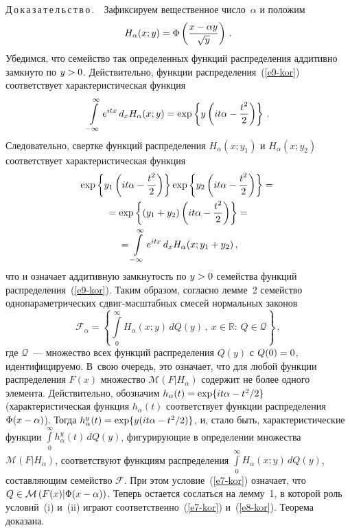 \begin{multicols}{2}
\noindent
Д\,о\,к\,а\,з\,а\,т\,е\,л\,ь\,с\,т\,в\,о\,.\ \  Зафиксируем вещественное чис\-ло~$\alpha$
и положим
\begin{equation}
H_{\alpha}(x;y)=\Phi\left(\displaystyle\frac{\displaystyle x-\alpha y\mathstrut}{\displaystyle \sqrt{y}\mathstrut}\right)\,.
\label{e9-kor}
\end{equation}
Убедимся, что семейство так определенных функций распределения
аддитивно замкнуто по $y\hm>0$. Действительно, функции распределения~(\ref{e9-kor}) 
соответствует характеристическая функция
$$
\int\limits_{-\infty}^{\infty}e^{itx}\,d_xH_{\alpha}(x;y)=\exp
\left\{y\left(it\alpha-\displaystyle\frac{\displaystyle t^2\mathstrut}{\displaystyle 2\mathstrut}\right)\right\}\,.
$$
Следовательно, свертке функций распределения $H_{\alpha}(x;y_1)$ и
$H_{\alpha}(x;y_2)$ соответствует характеристическая функция
\begin{multline*}
\exp\left\{y_1\left(it\alpha-\displaystyle\frac{\displaystyle t^2\mathstrut}{\displaystyle 2\mathstrut}\right)\right\}\exp
\left\{y_2\left(it\alpha-\displaystyle\frac{\displaystyle t^2\mathstrut}{\displaystyle 2\mathstrut}\right)\right\}={}\\
{}=
\exp\left\{\left(y_1+y_2\right)\left(it\alpha-\displaystyle\frac{\displaystyle t^2\mathstrut}{\displaystyle 2\mathstrut}\right)\right\}
={}\\
{}=\int\limits_{-\infty}^{\infty}e^{itx}\,d_xH_{\alpha}(x;y_1+y_2)\,,
\end{multline*}
что и означает аддитивную замкнутость по $y\hm>0$ семейства функций
распределения~(\ref{e9-kor}). Таким образом, согласно лемме~2 семейство
одно\-па\-ра\-мет\-ри\-че\-ских сдвиг-мас\-штаб\-ных смесей нормальных законов
$$
\mathcal{F}_{\alpha}=\left\{\int\limits_{0}^{\infty}
H_{\alpha}(x;y)\,dQ(y)\,,\ x\in\mathbb{R}:\,Q\in\mathcal{Q}\right\}\,,
$$
где $\mathcal{Q}$~--- множество всех функций распределения $Q(y)$ с
$Q(0)\hm=0$, идентифицируемо. В~свою очередь, это означает, что для
любой функции распределения $F(x)$ множество
$\mathcal{M}(F|H_{\alpha})$ содержит не более одного элемента.
Действительно, обозначим $h_{\alpha}(t)\hm=\exp\{it\alpha-t^2/2\}$
(характе\-ри\-стическая функция $h_{\alpha}(t)$ соответствует функции\linebreak
распределения $\Phi(x\hm-\alpha)$). Тогда
$h_{\alpha}^y(t)\hm=\exp\{y(it\alpha\hm-t^2/2)\}$, и, стало быть,
характеристические функции
$\int\limits_{0}^{\infty}h_{\alpha}^y(t)\,dQ(y)$,
фигурирующие в определении множества $\mathcal{M}(F|H_{\alpha})$,
соответствуют функциям распределения
$\int\limits_{0}^{\infty}H_{\alpha}(x;y)\,dQ(y)$,
со\-став\-ля\-ющим семейство $\mathcal{F}$. При этом условие~(\ref{e7-kor}) означает,
что $Q\hm\in\mathcal{M}\left(F(x)|\Phi(x\hm-\alpha)\right)$. Теперь остается
сослаться на лемму~1, в которой роль условий~(i) и~(ii) играют
соответственно~(\ref{e7-kor}) и~(\ref{e8-kor}). Теорема доказана.


\end{multicols}
